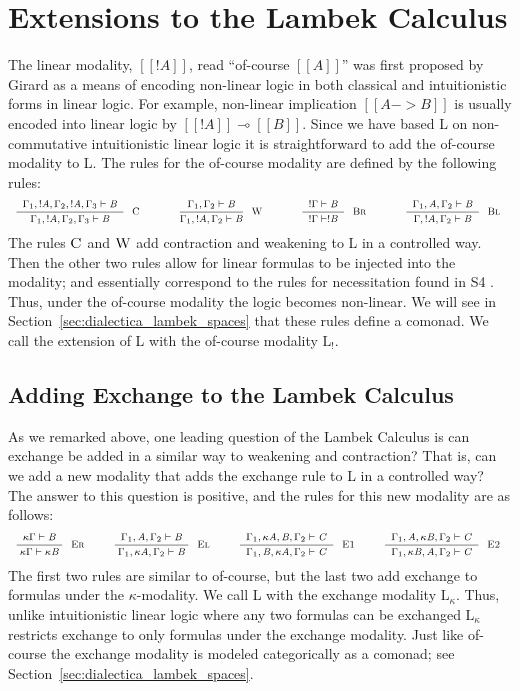 \documentclass{entcs}
\newcommand{\LB}{\text{L}_!}
\newcommand{\LE}{\text{L}_\kappa}
\begin{document}
\section{
Extensions to the Lambek Calculus}
\label{subsec:the_lambek_calculus_with_the_weakening_and_contraction_modality}

The linear modality, $[[! A]]$, read ``of-course $[[A]]$'' was first
proposed by Girard \cite{Girard:1987} as a means of encoding
non-linear logic in both classical and intuitionistic forms in linear
logic.  For example, non-linear implication $[[A -> B]]$ is usually
encoded into linear logic by $[[!A]] \multimap [[B]]$. Since we have
based L on non-commutative intuitionistic linear logic it is
straightforward to add the of-course modality to L.  The rules for the
of-course modality are defined by the following rules:
\[
\small
\begin{array}{ccccccccccc}
  \LdruleC{} & \quad & \LdruleW{} & \quad & 
  \LdruleBr{} & \quad & \LdruleBl{}
\end{array}
\]
The rules $\textsc{C}$ and $\textsc{W}$ add contraction and
weakening to L in a controlled way.  Then the other two rules allow
for linear formulas to be injected into the modality; and essentially
correspond to the rules for necessitation found in S4
\cite{bierman2000}.  Thus, under the of-course modality the logic
becomes non-linear. We will see in
Section~\ref{sec:dialectica_lambek_spaces} that these rules define a
comonad.  We call the extension of L with the of-course modality
$\LB$.

\subsection{Adding Exchange to the Lambek Calculus}
\label{subsec:the_lambek_calculus_with_the_exchange_modality}
As we remarked above, one leading question of the Lambek Calculus is
can exchange be added in a similar way to weakening and contraction?
That is, can we add a new modality that adds the exchange rule to L in
a controlled way?  The answer to this question is positive, and the
rules for this new modality are as follows:
\[
\small
\begin{array}{ccccccccccccccccccccc}  
  \LdruleEr{} & & \LdruleEl{} & & \LdruleEOne{} & & \LdruleETwo{} 
\end{array}
\]
The first two rules are similar to of-course, but the last two add
exchange to formulas under the $\kappa$-modality.  We call L with the
exchange modality $\LE$.  Thus, unlike intuitionistic linear logic
where any two formulas can be exchanged $\LE$ restricts exchange to
only formulas under the exchange modality.  Just like of-course
the exchange modality is modeled categorically as a comonad; see
Section~\ref{sec:dialectica_lambek_spaces}.
\end{document}
